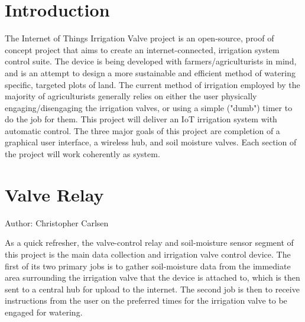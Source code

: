 \documentclass[onecolumn, draftclsnofoot,10pt, compsoc]{IEEEtran}
\begin{document}
    \newpage
    \tableofcontents
    \clearpage
    \section{Introduction}
        The Internet of Things Irrigation Valve project is an open-source, proof of concept project that aims to create an internet-connected, irrigation system control suite.
    The device is being developed with farmers/agriculturists in mind, and is an attempt to design a more sustainable and efficient method of watering specific, targeted plots of land.
    The current method of irrigation employed by the majority of agriculturists generally relies on either the user physically engaging/disengaging the irrigation valves, or using a simple ("dumb") timer to do the job for them.
    This project will deliver an IoT irrigation system with automatic control. 
    The three major goals of this project are completion of a graphical user interface, a wireless hub, and soil moisture valves.
    Each section of the project will work coherently as system. 
    
    \section{Valve Relay}
    Author: Christopher Carlsen
    
As a quick refresher, the valve-control relay and soil-moisture sensor segment of this project is the main data collection and irrigation valve control device.
The first of its two primary jobs is to gather soil-moisture data from the immediate area surrounding the irrigation valve that the device is attached to, which is then sent to a central hub for upload to the internet.
The second job is then to receive instructions from the user on the preferred times for the irrigation valve to be engaged for watering.
\end{document}
